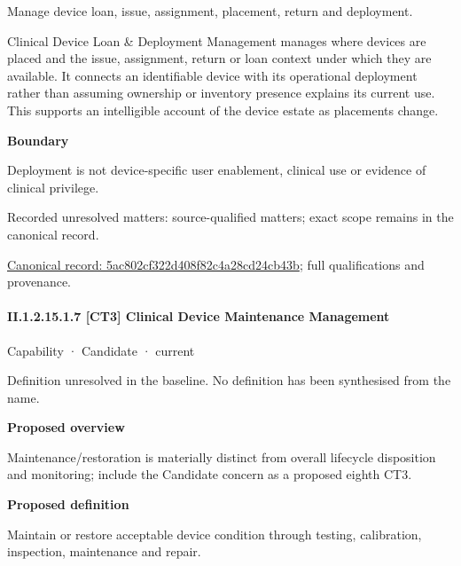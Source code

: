 Manage device loan, issue, assignment, placement, return and deployment.



Clinical Device Loan \& Deployment Management manages where devices are placed and the issue, assignment, return or loan context under which they are available. It connects an identifiable device with its operational deployment rather than assuming ownership or inventory presence explains its current use. This supports an intelligible account of the device estate as placements change.



\textbf{Boundary}



Deployment is not device-specific user enablement, clinical use or evidence of clinical privilege.


{\small Recorded unresolved matters: source-qualified matters; exact scope remains in the canonical record.}\par
{\footnotesize \href{../../../../continuum/strategy/capability/5ac802cf322d408f82c4a28cd24cb43b.md}{Canonical record: 5ac802cf322d408f82c4a28cd24cb43b}; full qualifications and provenance.}\par
\paragraph*{II.1.2.15.1.7 [CT3] Clinical Device Maintenance Management}
\label{navigation:II.1.2.15.1.7}

\label{element:731ea36d36d8466d84196ccda2e61cf9}
{\small Capability · Candidate · current}\par

Definition unresolved in the baseline. No definition has been synthesised from the name.



\textbf{Proposed overview}



Maintenance/restoration is materially distinct from overall lifecycle disposition and monitoring; include the Candidate concern as a proposed eighth CT3.



\textbf{Proposed definition}



Maintain or restore acceptable device condition through testing, calibration, inspection, maintenance and repair.



